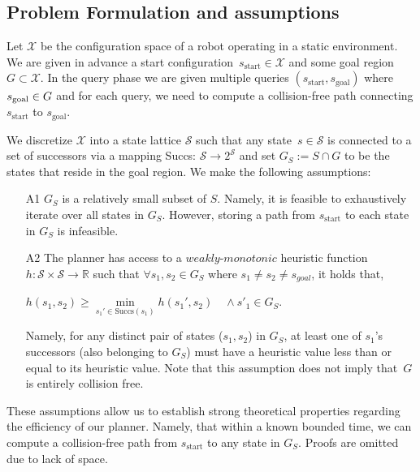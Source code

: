 \documentclass[letterpaper, 10 pt, conference]{ieeeconf}  %
\newcommand{\calX}{\ensuremath{\mathcal{X}}\xspace}
\newcommand{\calS}{\ensuremath{\mathcal{S}}\xspace}
\newcommand{\sStart}{\ensuremath{s_{\text{start}}\xspace}}
\begin{document}
\subsection{Problem Formulation and assumptions}
Let $\calX$ be the configuration space of a robot operating in a static environment.
We are given in advance a start configuration~$\sStart \in \calX$ and some goal region~$G \subset \calX$.
In the query phase we are given multiple queries $(\sStart, s_{\text{goal}})$ where $s_{\rm goal} \in G$ and for each query, we need to compute a collision-free path connecting $\sStart$ to $s_{\text{goal}}$.

We discretize $\calX$ into a state lattice $\calS$ such that any state~$s \in \calS$ is connected to a set of successors via a mapping Succs: $\calS \rightarrow 2^\calS$
and set $G_S := S \cap G$ to be the states that reside in the goal region.
We make the following assumptions:

\begin{enumerate}
  \item[A1] $G_S$ is a relatively small subset of $S$. Namely, it is feasible to exhaustively iterate over all states in $G_S$.
However, storing a path from $\sStart$ to each state in $G_S$ is infeasible.
  
  \item[A2] The planner has access to a $\textit{weakly-monotonic}$ heuristic function $h: \calS \times \calS \rightarrow \mathbb{R}$ such that $\forall s_1, s_2  \in G_S$ where $s_1 \neq s_2 \neq s_{goal}$, it holds that,

  \begin{center}
    $h(s_1, s_2) \geq \min\limits_{s_1' \in \text{Succs}(s_1)} h(s_1', s_2) \quad \wedge s'_1\in G_S $. 
  \end{center}
  Namely, for any distinct pair of states ($s_1, s_2$) in $G_S$, at least one of $s_1$'s successors (also belonging to $G_S$) must have a heuristic value less than or equal to its heuristic value. 
	Note that this assumption does not imply  that~$G$ is entirely collision free.
%	
%	
\end{enumerate}

These assumptions allow us to establish strong theoretical properties regarding the efficiency of our planner. Namely, that
within a known bounded time, we can compute a collision-free path from $\sStart$ to any state in $G_S$. Proofs are omitted due to lack of space. 
\end{document}
